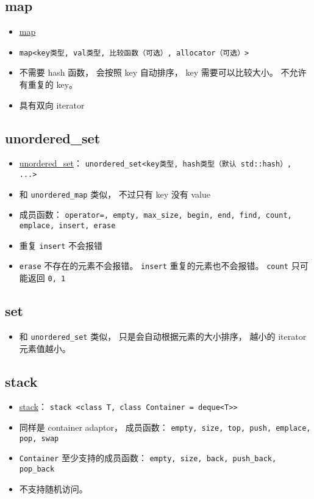 \subsection{map}
\begin{itemize}
\item \href{https://cplusplus.com/reference/map/map/}{map}
\item \verb|map<key类型, val类型, 比较函数（可选）, allocator（可选）>|
\item 不需要 hash 函数， 会按照 key 自动排序， key 需要可以比较大小。 不允许有重复的 key。
\item 具有双向 iterator
\end{itemize}

\subsection{unordered\_set}
\begin{itemize}
\item \href{https://cplusplus.com/reference/unordered_set/unordered_set/}{unordered\_set}： \verb|unordered_set<key类型, hash类型（默认 std::hash）, ...>|
\item 和 \verb|unordered_map| 类似， 不过只有 key 没有 value
\item 成员函数： \verb|operator=, empty, max_size, begin, end, find, count, emplace, insert, erase|
\item 重复 \verb|insert| 不会报错
\item \verb|erase| 不存在的元素不会报错。 \verb|insert| 重复的元素也不会报错。 \verb|count| 只可能返回 \verb|0, 1|
\end{itemize}

\subsection{set}
\begin{itemize}
\item 和 \verb|unordered_set| 类似， 只是会自动根据元素的大小排序， 越小的 iterator 元素值越小。
\end{itemize}

\subsection{stack}
\begin{itemize}
\item \href{https://cplusplus.com/reference/stack/stack/}{stack}： \verb|stack <class T, class Container = deque<T>>|
\item 同样是 container adaptor， 成员函数： \verb|empty, size, top, push, emplace, pop, swap|
\item \verb|Container| 至少支持的成员函数： \verb|empty, size, back, push_back, pop_back|
\item 不支持随机访问。
\end{itemize}

